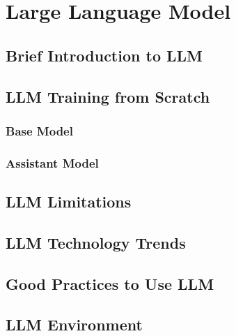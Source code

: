 \chapter{Large Language Model} \label{ch:llm}

\section{Brief Introduction to LLM}

\section{LLM Training from Scratch}

\subsection{Base Model}

\subsection{Assistant Model}

\section{LLM Limitations}

\section{LLM Technology Trends}

\section{Good Practices to Use LLM}

\section{LLM Environment}

